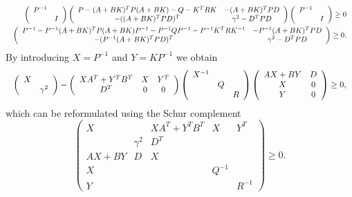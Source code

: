 \begin{equation}\Resize{\begin{aligned}
	\left(\begin{array}{cc}
	P^{-1} &  \\  & I
	\end{array}\right)
	\left(\begin{array}{cc}
	P - (A+BK)^T P (A+BK) - Q - K^T R K & -(A+BK)^T P D \\
	- ((A+BK)^T P D)^T & \gamma^2 - D^T P D
	\end{array}\right)
	\left(\begin{array}{cc}
	P^{-1} &  \\  & I
	\end{array}\right) \geq 0\\
	\left(\begin{array}{cc}
	P^{-1} - P^{-1}(A+BK)^T P (A+BK)P^{-1} - P^{-1}QP^{-1} - P^{-1}K^T R K^{-1} & -P^{-1}(A+BK)^T P D \\
	- (P^{-1}(A+BK)^T P D)^T & \gamma^2 - D^T P D
	\end{array}\right)\geq 0.
\end{aligned}}\end{equation}
%
By introducing $X=P^{-1}$ and $Y = K P^{-1}$ we obtain
%
\begin{equation}\Resize{
	\left(\begin{array}{cc}
	X & \\ & \gamma^2
	\end{array}\right)
	-\left(\begin{array}{ccc}
	XA^T + Y^T B^T & X & Y^T \\
	D^T & 0 & 0
	\end{array}\right)
	\left(\begin{array}{ccc}
	X^{-1} & & \\
	& Q & \\
	& & R
	\end{array}\right)
	\left(\begin{array}{cc}
	AX + BY & D \\
	X & 0 \\
	Y & 0
	\end{array}\right) \geq 0,}
\end{equation}
%
which can be reformulated using the Schur complement
%
\begin{equation}\label{app:eq:SDP:for:terminal:controller}
	\left(\begin{array}{cc|ccc}
	X & & XA^T + Y^T B^T & X & Y^T \\
	 & \gamma^2 & D^T & & \\ \hline
	 AX + BY & D & X & & \\
	 X & & & Q^{-1} & \\
	 Y & & & & R^{-1}
	\end{array}\right) \geq 0.
\end{equation}
